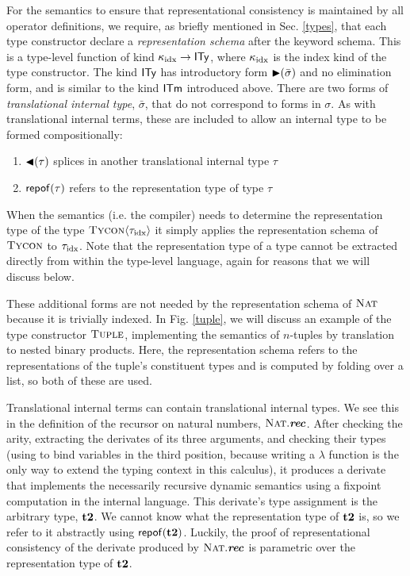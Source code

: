 For the semantics to ensure that representational consistency is maintained by all operator definitions, we require, as briefly mentioned in Sec. \ref{types}, that each type constructor declare a \emph{representation schema} after the keyword \textsf{schema}. This is a type-level function of kind $\kappa_{\text{idx}}\rightarrow{\textsf{ITy}}$, where $\kappa_{\text{idx}}$ is the index kind of the type constructor. The kind $\textsf{ITy}$ has introductory form ${\blacktriangleright}(\bar \sigma)$ and no elimination form, and is similar to the kind $\textsf{ITm}$ introduced above. There are two forms of \emph{translational internal type}, $\bar \sigma$, that do not correspond to forms in $\sigma$. As with translational internal terms, these are included to allow an internal type to be formed compositionally:
\begin{enumerate}
\item ${\blacktriangleleft}(\tau)$ splices in another translational internal type $\tau$
\item ${\sf repof}(\tau)$ refers to the representation type of type $\tau$
\end{enumerate}

When the semantics (i.e. the compiler) needs to determine the representation type of the type $\textsc{Tycon}\langle{\tau_{\text{idx}}}\rangle$ it simply applies the representation schema of $\textsc{Tycon}$ to ${{\tau_{\text{idx}}}}$. Note that the representation type of a type cannot be extracted directly from within the type-level language, again for reasons that we will discuss below. 

These additional forms are not needed by the representation schema of $\textsc{Nat}$  because it is trivially indexed. In Fig. \ref{tuple}, we will discuss an example of the type constructor $\textsc{Tuple}$, implementing the semantics of $n$-tuples by translation to nested binary products. Here, the representation schema refers to the representations of the tuple's constituent types and is computed by folding over a list, so both of these are used. 

Translational internal terms can contain translational internal types. We see this in the definition of the recursor on natural numbers, $\textsc{Nat}.\textbf{\textit{rec}}$. After checking the arity, extracting the derivates of its three arguments, and checking their types (using  to bind variables in the third position, because writing a $\lambda$ function is the only way to extend the typing context in this calculus), it produces a derivate that implements the necessarily recursive dynamic semantics using a fixpoint computation in the internal language. This derivate's type assignment is the arbitrary type, ${\textbf{t2}}$. We cannot know what the representation type of ${\textbf{t2}}$ is, so we refer to it abstractly using ${\sf repof}({\textbf{t2}})$. Luckily, the proof of representational consistency of the derivate produced by $\textsc{Nat}.\textbf{\textit{rec}}$ is parametric over the representation type of ${\textbf{t2}}$. 


